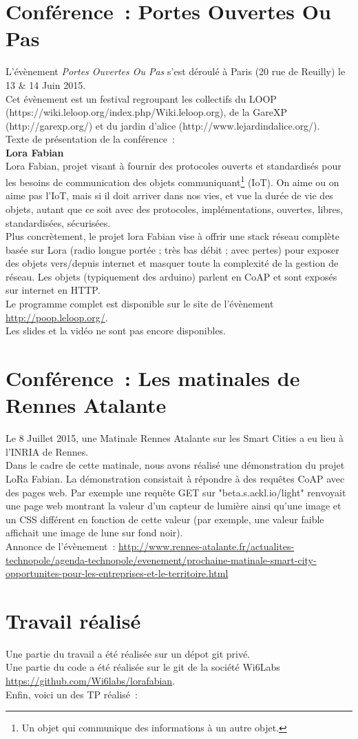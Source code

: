 \documentclass{article}
\begin{document}
	\section{Conférence~: Portes Ouvertes Ou Pas}
L'évènement \emph{Portes Ouvertes Ou Pas} s'est déroulé à Paris (20 rue de Reuilly) le 13 \& 14 Juin 2015.\\
Cet évènement est un festival regroupant les collectifs du LOOP (https://wiki.leloop.org/index.php/Wiki.leloop.org), de la GareXP (http://garexp.org/) et du jardin d'alice (http://www.lejardindalice.org/).\\
Texte de présentation de la conférence~:\\
\textbf{Lora Fabian}\\
    Lora Fabian, projet visant à fournir des protocoles ouverts et standardisés pour les besoins de communication des objets communiquant\footnote{Un objet qui communique des informations à un autre objet.} (IoT). On aime ou on aime pas l'IoT, mais si il doit arriver dans nos vies, et vue la durée de vie des objets, autant que ce soit avec des protocoles, implémentations, ouvertes, libres, standardisées, sécurisées.\\
    Plus concrètement, le projet lora Fabian vise à offrir une stack réseau complète basée sur Lora (radio longue portée ; très bas débit ; avec pertes) pour exposer des objets vers/depuis internet et masquer toute la complexité de la gestion de réseau. Les objets (typiquement des arduino) parlent en CoAP et sont exposés sur internet en HTTP.\\
Le programme complet est disponible sur le site de l'évènement \url{http://poop.leloop.org/}.\\
Les slides et la vidéo ne sont pas encore disponibles.
	\section{Conférence~: Les matinales de Rennes Atalante}
Le 8 Juillet 2015, une Matinale Rennes Atalante sur les Smart Cities a eu lieu à l'INRIA de Rennes.\\
Dans le cadre de cette matinale, nous avons réalisé une démonstration du projet LoRa Fabian. La démonstration consistait à répondre à des requêtes CoAP avec des pages web. Par exemple une requête GET sur "beta.s.ackl.io/light" renvoyait une page web montrant la valeur d'un capteur de lumière ainsi qu'une image et un CSS différent en fonction de cette valeur (par exemple, une valeur faible affichait une image de lune sur fond noir).\\
Annonce de l'évènement~: \url{http://www.rennes-atalante.fr/actualites-technopole/agenda-technopole/evenement/prochaine-matinale-smart-city-opportunites-pour-les-entreprises-et-le-territoire.html}
	\section{Travail réalisé}
	Une partie du travail a été réalisée sur un dépot git privé.\\
	Une partie du code a été réalisée sur le git de la société Wi6Labs \url{https://github.com/Wi6labs/lorafabian}.\\
	Enfin, voici un des TP réalisé~:\\
	
\end{document}
